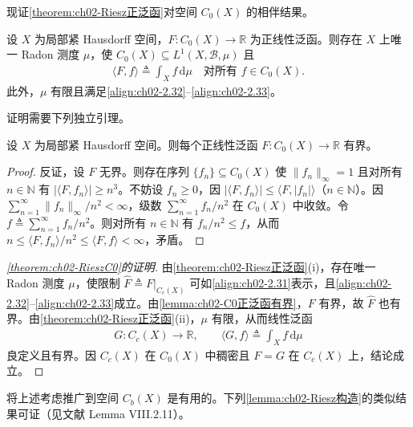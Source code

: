 \documentclass[../../main.tex]{subfiles}%
\begin{document}
现证\cref{theorem:ch02-Riesz正泛函}对空间 $C_0(X)$ 的相伴结果。

\begin{theorem}\label{theorem:ch02-RieszC0}\label{theorem:ch02-Riesz范数}\label{theorem:ch02-Riesz表示}
\label{theorem:ch02-Rf对偶}
设 $X$ 为局部紧 Hausdorff 空间，$F:C_0(X)\to\mathbb R$ 为正线性泛函。则存在 $X$ 上唯一 Radon 测度 $\mu$，使 $C_0(X)\subseteq L^1(X,\mathscr B,\mu)$ 且
\begin{align}
\langle F,f\rangle\triangleq \int_X f\,\mathrm{d}\mu\quad\text{对所有 }f\in C_0(X). \label{align:ch02-2.45}
\end{align}
此外，$\mu$ 有限且满足\eqref{align:ch02-2.32}--\eqref{align:ch02-2.33}。
\end{theorem}

证明需要下列独立引理。

\begin{lemma}\label{lemma:ch02-C0正泛函有界}
设 $X$ 为局部紧 Hausdorff 空间。则每个正线性泛函 $F:C_0(X)\to\mathbb R$ 有界。
\end{lemma}

\begin{proof}
反证，设 $F$ 无界。则存在序列 $\{f_n\}\subseteq C_0(X)$ 使 $\|f_n\|_\infty=1$ 且对所有 $n\in\mathbb N$ 有 $|\langle F,f_n\rangle|\geqslant n^3$。不妨设 $f_n\geqslant0$，因 $|\langle F,f_n\rangle|\leqslant\langle F,|f_n|\rangle$（$n\in\mathbb N$）。因 $\sum_{n=1}^\infty\|f_n\|_\infty/n^2<\infty$，级数 $\sum_{n=1}^\infty f_n/n^2$ 在 $C_0(X)$ 中收敛。令 $f\triangleq \sum_{n=1}^\infty f_n/n^2$。则对所有 $n\in\mathbb N$ 有 $f_n/n^2\leqslant f$，从而 $n\leqslant\langle F,f_n\rangle/n^2\leqslant\langle F,f\rangle<\infty$，矛盾。
\end{proof}

\begin{proof}[\cref{theorem:ch02-RieszC0}的证明]
由\cref{theorem:ch02-Riesz正泛函}(i)，存在唯一 Radon 测度 $\mu$，使限制 $\hat F\triangleq F|_{C_c(X)}$ 可如\eqref{align:ch02-2.31}表示，且\eqref{align:ch02-2.32}--\eqref{align:ch02-2.33}成立。由\cref{lemma:ch02-C0正泛函有界}，$F$ 有界，故 $\hat F$ 也有界。由\cref{theorem:ch02-Riesz正泛函}(ii)，$\mu$ 有限，从而线性泛函
\begin{align*}
G:C_c(X)\to\mathbb R,\qquad\langle G,f\rangle\triangleq \int_X f\,\mathrm{d}\mu
\end{align*}
良定义且有界。因 $C_c(X)$ 在 $C_0(X)$ 中稠密且 $F=G$ 在 $C_c(X)$ 上，结论成立。
\end{proof}

将上述考虑推广到空间 $C_b(X)$ 是有用的。下列\cref{lemma:ch02-Riesz构造}的类似结果可证（见文献\cite{ref45} Lemma VIII.2.11）。
\end{document}
